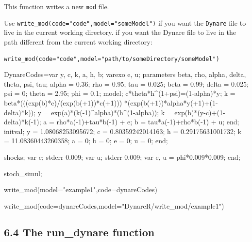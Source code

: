 \documentclass[
  12pt,
  legalpaperpaper,
  DIV=11,
  numbers=noendperiod]{scrartcl}
\newenvironment{Shaded}{\begin{snugshade}}{\end{snugshade}}
\newcommand{\AttributeTok}[1]{\textcolor[rgb]{0.40,0.45,0.13}{#1}}
\newcommand{\FunctionTok}[1]{\textcolor[rgb]{0.28,0.35,0.67}{#1}}
\newcommand{\NormalTok}[1]{\textcolor[rgb]{0.00,0.23,0.31}{#1}}
\newcommand{\OtherTok}[1]{\textcolor[rgb]{0.00,0.23,0.31}{#1}}
\newcommand{\StringTok}[1]{\textcolor[rgb]{0.13,0.47,0.30}{#1}}
\begin{document}
This function writes a new \texttt{mod} file.

Use \texttt{write\_mod(code="code",model="someModel")} if you want the
\texttt{Dynare} file to live in the current working directory. if you
want the Dynare file to live in the path different from the current
working directory:

\texttt{write\_mod(code="code",model="path/to/someDirectory/someModel")}

\begin{Shaded}
\begin{Highlighting}[]
\NormalTok{DynareCodes}\OtherTok{=}\StringTok{\textquotesingle{}var y, c, k, a, h, b;}
\StringTok{varexo e, u;}
\StringTok{parameters beta, rho, alpha, delta, theta, psi, tau;}
\StringTok{alpha = 0.36;}
\StringTok{rho   = 0.95;}
\StringTok{tau   = 0.025;}
\StringTok{beta  = 0.99;}
\StringTok{delta = 0.025;}
\StringTok{psi   = 0;}
\StringTok{theta = 2.95;}
\StringTok{phi   = 0.1;}
\StringTok{model;}
\StringTok{c*theta*h\^{}(1+psi)=(1{-}alpha)*y;}
\StringTok{k = beta*(((exp(b)*c)/(exp(b(+1))*c(+1)))}
\StringTok{          *(exp(b(+1))*alpha*y(+1)+(1{-}delta)*k));}
\StringTok{y = exp(a)*(k({-}1)\^{}alpha)*(h\^{}(1{-}alpha));}
\StringTok{k = exp(b)*(y{-}c)+(1{-}delta)*k({-}1);}
\StringTok{a = rho*a({-}1)+tau*b({-}1) + e;}
\StringTok{b = tau*a({-}1)+rho*b({-}1) + u;}
\StringTok{end;}
\StringTok{initval;}
\StringTok{y = 1.08068253095672;}
\StringTok{c = 0.80359242014163;}
\StringTok{h = 0.29175631001732;}
\StringTok{k = 11.08360443260358;}
\StringTok{a = 0;}
\StringTok{b = 0;}
\StringTok{e = 0;}
\StringTok{u = 0;}
\StringTok{end;}

\StringTok{shocks;}
\StringTok{var e; stderr 0.009;}
\StringTok{var u; stderr 0.009;}
\StringTok{var e, u = phi*0.009*0.009;}
\StringTok{end;}

\StringTok{stoch\_simul;\textquotesingle{}}


\FunctionTok{write\_mod}\NormalTok{(}\AttributeTok{model=}\StringTok{"example1"}\NormalTok{,}\AttributeTok{code=}\NormalTok{dynareCodes)}

\FunctionTok{write\_mod}\NormalTok{(}\AttributeTok{code=}\NormalTok{dynareCodes,}\AttributeTok{model=}\StringTok{"DynareR/write\_mod/example1"}\NormalTok{)}
\end{Highlighting}
\end{Shaded}

\hypertarget{the-run_dynare-function}{%
\subsection{6.4 The run\_dynare
function}\label{the-run_dynare-function}}
\end{document}
